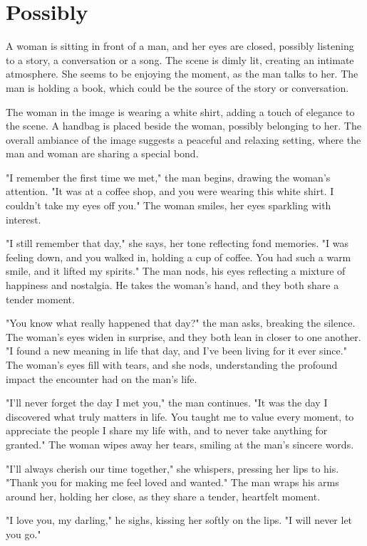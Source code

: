 \documentclass[smalldemyvopaper,11pt,twoside,onecolumn,openright,extrafontsizes]{memoir}
\begin{document}
\chapter{Possibly}
A woman is sitting in front of a man, and her eyes are closed, possibly listening to a story, a conversation or a song. The scene is dimly lit, creating an intimate atmosphere. She seems to be enjoying the moment, as the man talks to her. The man is holding a book, which could be the source of the story or conversation.\par
The woman in the image is wearing a white shirt, adding a touch of elegance to the scene. A handbag is placed beside the woman, possibly belonging to her. The overall ambiance of the image suggests a peaceful and relaxing setting, where the man and woman are sharing a special bond.\par
"I remember the first time we met," the man begins, drawing the woman's attention. "It was at a coffee shop, and you were wearing this white shirt. I couldn't take my eyes off you." The woman smiles, her eyes sparkling with interest.\par
"I still remember that day," she says, her tone reflecting fond memories. "I was feeling down, and you walked in, holding a cup of coffee. You had such a warm smile, and it lifted my spirits." The man nods, his eyes reflecting a mixture of happiness and nostalgia. He takes the woman's hand, and they both share a tender moment.\par
"You know what really happened that day?" the man asks, breaking the silence. The woman's eyes widen in surprise, and they both lean in closer to one another. "I found a new meaning in life that day, and I've been living for it ever since." The woman's eyes fill with tears, and she nods, understanding the profound impact the encounter had on the man's life.\par
"I'll never forget the day I met you," the man continues. "It was the day I discovered what truly matters in life. You taught me to value every moment, to appreciate the people I share my life with, and to never take anything for granted." The woman wipes away her tears, smiling at the man's sincere words.\par
"I'll always cherish our time together," she whispers, pressing her lips to his. "Thank you for making me feel loved and wanted." The man wraps his arms around her, holding her close, as they share a tender, heartfelt moment.\par
"I love you, my darling," he sighs, kissing her softly on the lips. "I will never let you go."\par
\end{document}
